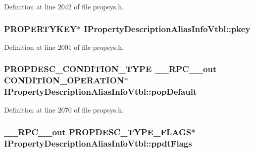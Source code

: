 Definition at line 2042 of file propsys.\+h.

\subsubsection[{\texorpdfstring{pkey}{pkey}}]{ {\bf P\+R\+O\+P\+E\+R\+T\+Y\+K\+EY}$\ast$ I\+Property\+Description\+Alias\+Info\+Vtbl\+::pkey}\hypertarget{struct_i_property_description_alias_info_vtbl_ab46b7529dd9c630a0f9efeb294c2cbac}{}\label{struct_i_property_description_alias_info_vtbl_ab46b7529dd9c630a0f9efeb294c2cbac}


Definition at line 2001 of file propsys.\+h.

\subsubsection[{\texorpdfstring{pop\+Default}{popDefault}}]{ {\bf P\+R\+O\+P\+D\+E\+S\+C\+\_\+\+C\+O\+N\+D\+I\+T\+I\+O\+N\+\_\+\+T\+Y\+PE} {\bf \+\_\+\+\_\+\+R\+P\+C\+\_\+\+\_\+out} {\bf C\+O\+N\+D\+I\+T\+I\+O\+N\+\_\+\+O\+P\+E\+R\+A\+T\+I\+ON}$\ast$ I\+Property\+Description\+Alias\+Info\+Vtbl\+::pop\+Default}\hypertarget{struct_i_property_description_alias_info_vtbl_ac0047d4be9f9fbc3d4aea83a193033d3}{}\label{struct_i_property_description_alias_info_vtbl_ac0047d4be9f9fbc3d4aea83a193033d3}


Definition at line 2070 of file propsys.\+h.

\subsubsection[{\texorpdfstring{ppdt\+Flags}{ppdtFlags}}]{ {\bf \+\_\+\+\_\+\+R\+P\+C\+\_\+\+\_\+out} {\bf P\+R\+O\+P\+D\+E\+S\+C\+\_\+\+T\+Y\+P\+E\+\_\+\+F\+L\+A\+GS}$\ast$ I\+Property\+Description\+Alias\+Info\+Vtbl\+::ppdt\+Flags}\hypertarget{struct_i_property_description_alias_info_vtbl_a011b3a9a78dd187b25b7bd8e151173f0}{}\label{struct_i_property_description_alias_info_vtbl_a011b3a9a78dd187b25b7bd8e151173f0}


